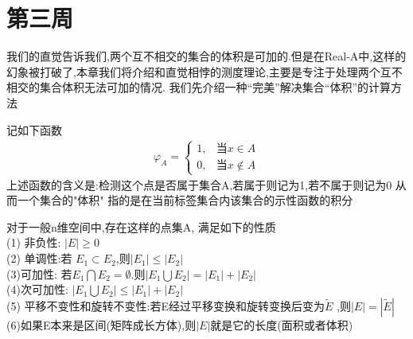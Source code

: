 \section{第三周}
我们的直觉告诉我们,两个互不相交的集合的体积是可加的.但是在Real-A中,这样的幻象被打破了,本章我们将介绍和直觉相悖的测度理论,主要是专注于处理两个互不相交的集合体积无法可加的情况.
我们先介绍一种“完美”解决集合“体积”的计算方法
\begin{Theorem}[示性函数]
  记如下函数 \begin{align}
    \varphi_{A} = \begin{cases}
      1, &\text{当} x \in A \\
      0, &\text{当} x \notin A 
    \end{cases}
  \end{align} 
  上述函数的含义是:检测这个点是否属于集合A,若属于则记为1,若不属于则记为0 从而一个集合的"体积"
  指的是在当前标签集合内该集合的示性函数的积分
\end{Theorem}
\begin{Theorem}[]
  对于一般n维空间中,存在这样的点集A, 满足如下的性质
  \\
  (1) 非负性: \(|E| \geq 0\)
  \\
  (2) 单调性:若 \(E_1 \subset E_2 \),则\(|E_1| \leq |E_2|\)
  \\
  (3)可加性: 若\(E_1 \bigcap E_2 =\emptyset \).则\(|E_1\bigcup E_2 | =|E_1|+|E_2|\)
  \\
  (4)次可加性: \(|E_1 \bigcup E_2| \leq |E_1| +|E_2| \)
  \\
  (5) 平移不变性和旋转不变性:若E经过平移变换和旋转变换后变为\(\widetilde{E} \) ,则\(|E| =|\widetilde{E}| \)
  \\
  (6)如果E本来是区间(矩阵成长方体),则\(|E|\)就是它的长度(面积或者体积)
\end{Theorem}
